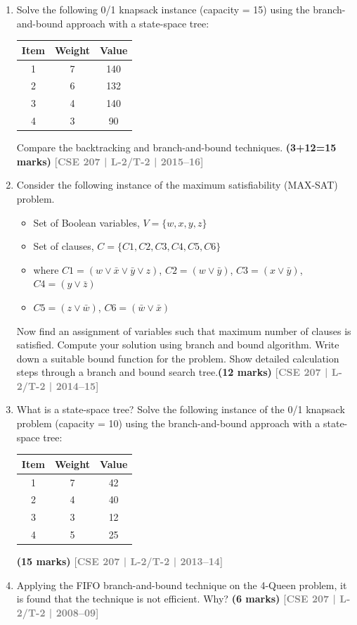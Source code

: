 \documentclass[12pt]{article}
\newcommand{\yr}[1]{\hfill\textcolor{gray}{\small\textbf{[#1]}}}
\newcommand{\mk}[1]{\textcolor{orange!70!black}{\small\textbf{(#1 marks)}}}
\begin{document}
\begin{enumerate}
\item Solve the following 0/1 knapsack instance (capacity = 15) using the branch-and-bound approach with a state-space tree:
\begin{center}
\begin{tabular}{ccc}
\toprule
Item & Weight & Value \\
\midrule
1 & 7 & 140 \\
2 & 6 & 132 \\
3 & 4 & 140 \\
4 & 3 & 90 \\
\bottomrule
\end{tabular}
\end{center}
Compare the backtracking and branch-and-bound techniques. \mk{3+12=15}
\yr{CSE 207 | L-2/T-2 | 2015--16}


\item Consider the following instance of the maximum satisfiability (MAX-SAT) problem.

\begin{itemize}
    \item[] Set of Boolean variables, $V = \{w, x, y, z\}$
    \item[] Set of clauses, $C = \{C1, C2, C3, C4, C5, C6\}$
    \item[] where $C1 = (w \vee \bar{x} \vee \bar{y} \vee z)$, \quad
            $C2 = (w \vee \bar{y})$, \quad
            $C3 = (x \vee \bar{y})$, \quad
            $C4 = (y \vee \bar{z})$
    \item[] $C5 = (z \vee \bar{w})$, \quad
            $C6 = (\bar{w} \vee \bar{x})$
\end{itemize}

\noindent
Now find an assignment of variables such that maximum number of clauses is satisfied.
Compute your solution using branch and bound algorithm. Write down a suitable bound
function for the problem. Show detailed calculation steps through a branch and bound
search tree.\mk{12}
\yr{CSE 207 | L-2/T-2 | 2014--15}


\item What is a state-space tree? Solve the following instance of the 0/1 knapsack problem (capacity = 10) using the branch-and-bound approach with a state-space tree:
\begin{center}
\begin{tabular}{ccc}
\toprule
Item & Weight & Value \\
\midrule
1 & 7 & 42 \\
2 & 4 & 40 \\
3 & 3 & 12 \\
4 & 5 & 25 \\
\bottomrule
\end{tabular}
\end{center}
\mk{15}
\yr{CSE 207 | L-2/T-2 | 2013--14}


  \item Applying the FIFO branch-and-bound technique on the 4-Queen problem, it is found that the technique is not efficient. Why? \mk{6}
\yr{CSE 207 | L-2/T-2 | 2008--09}


\end{enumerate}
\end{document}
